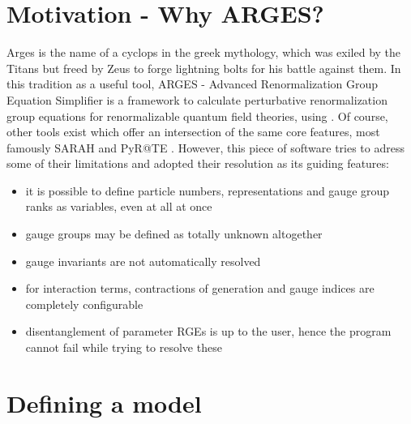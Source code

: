 \documentclass{scrartcl}
\begin{document}
\tableofcontents
\thispagestyle{empty}
\newpage
\section{Motivation - Why ARGES?}
Arges is the name of a cyclops in the greek mythology, which was exiled by the Titans but freed by Zeus to forge lightning bolts for his battle against them. \newline
In this tradition as a useful tool, ARGES - Advanced Renormalization Group Equation Simplifier is a framework to calculate perturbative renormalization group equations for renormalizable quantum field theories, using \cite{LuoWangXiao,MV1,MV2,MV3,OsbornJack,OsbornJack2,OsbornJack3,Decoding}. Of course, other tools exist which offer an intersection of the same core features, most famously SARAH \cite{SARAH,SARAH4} and PyR@TE \cite{pyrate,pyrate2}. However, this piece of software tries to adress some of their limitations and adopted their resolution as its guiding features:
\begin{itemize}
\item it is possible to define particle numbers, representations and gauge group ranks as variables, even at all at once
\item gauge groups may be defined as totally unknown altogether
\item gauge invariants are not automatically resolved
\item for interaction terms, contractions of generation and gauge indices are completely configurable
\item disentanglement of parameter RGEs is up to the user, hence the program cannot fail while trying to resolve these
\end{itemize}
\newpage
\section{Defining a model}
\end{document}
